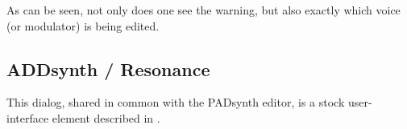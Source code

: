    As can be seen, not only does one see the warning, but also exactly which
   voice (or modulator) is being edited.

\subsection{ADDsynth / Resonance}
\label{subsec:addsynth_resonance}

   This dialog, shared in common with the PADsynth editor, is a stock
   user-interface element described in
   .

